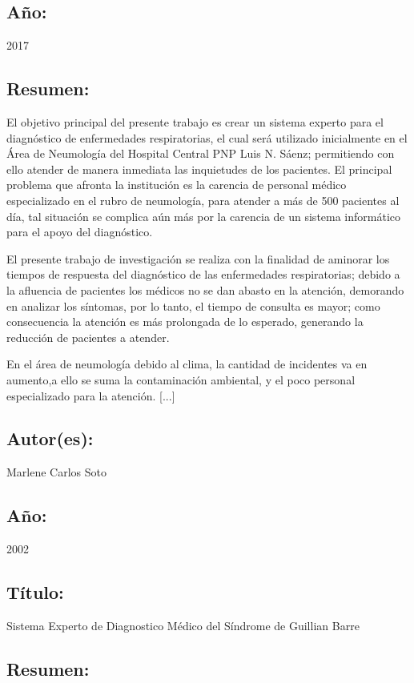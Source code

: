 \documentclass[preprint,12pt,notitlepage]{elsarticle}
\begin{document}
\subsection{Año:} 2017

\subsection{Resumen:}

El objetivo principal del presente trabajo es crear un sistema experto para el diagnóstico de enfermedades respiratorias, el cual será utilizado inicialmente en el Área de Neumología del Hospital Central PNP Luis N. Sáenz; permitiendo con ello atender de manera inmediata las inquietudes de los pacientes. El principal problema que afronta la institución es la carencia de personal médico especializado en el rubro de neumología, para atender a más de 500 pacientes al día, tal situación se complica aún más por la carencia de un sistema informático para el apoyo del diagnóstico.

El presente trabajo de investigación se realiza con la finalidad de aminorar los tiempos de respuesta del diagnóstico de las enfermedades respiratorias; debido a la afluencia de pacientes los médicos no se dan abasto en la atención, demorando en analizar los síntomas, por lo tanto, el tiempo de consulta es mayor; como consecuencia la atención es más prolongada de lo esperado, generando la reducción de pacientes a atender.

En el área de neumología debido al clima, la cantidad de incidentes va en aumento,a ello se suma la contaminación ambiental, y el poco personal especializado para la atención. [...]

\subsection{Autor(es):} Marlene Carlos Soto

\subsection{Año:} 2002

\subsection{Título:} Sistema Experto de Diagnostico Médico del Síndrome de Guillian Barre

\subsection{Resumen:}
\end{document}
